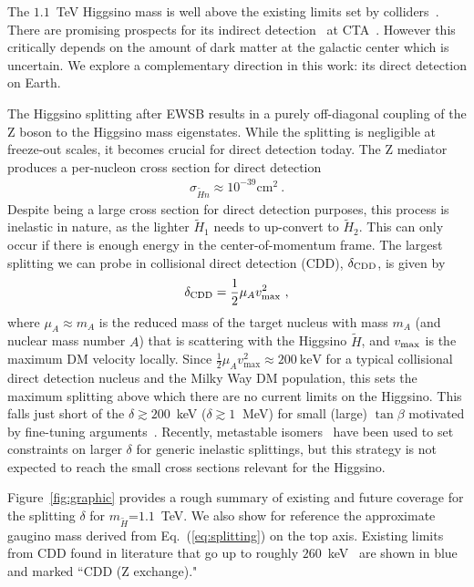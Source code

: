 \documentclass[aps,prd,amsmath,amssymb,10pt,letterpaper,balancelastpage,showpacs,superscriptaddress,nofootinbib,floatfix,notitlepage,longbibliography,twocolumn
]{revtex4-2}
\newcommand{\Eq}[1]{Eq.~(#1)}
\newcommand{\mx}{m_{\Ht}}
\newcommand{\vmax}{v_{\text{max}}}
\newcommand{\muA}{\mu_A}
\newcommand{\Ht}{\tilde{H}}
\begin{document}
The $1.1$~TeV Higgsino mass is well above the existing limits set by colliders~\cite{aaboud2018search}. There are promising prospects for its indirect detection~\cite{Rinchiuso:2020skh,Rodd:2024qsi} at CTA~\cite{CTAConsortium:2010umy}. However this critically depends on the amount of dark matter at the galactic center which is uncertain. We explore a complementary direction in this work: its direct detection on Earth. 

 The Higgsino splitting after EWSB results in a purely off-diagonal coupling of the Z boson to the Higgsino mass eigenstates. 
 While the splitting is negligible at freeze-out scales, it becomes crucial for direct detection today.  The Z mediator produces a per-nucleon cross section for direct detection
\begin{align} \label{eq:Higgsino cross section}
    \sigma_{\Ht n} \approx 10^{-39} \textrm{cm}^2 ~.
\end{align}
Despite being a large cross section for direct detection purposes, this process is inelastic in nature, as the lighter $\tilde{H}_1$ needs to up-convert to $\tilde{H}_2$.  This can only occur if there is enough energy in the center-of-momentum frame.  The largest splitting we can probe in collisional direct detection (CDD), $\delta_{\rm CDD}$, is given by  
\begin{align}
    \delta_{\rm CDD} =\frac{1}{2}\muA v_{\rm max}^2~,
    \label{eq:maxsplit}
\end{align} 
where $\muA \approx m_A$ is the reduced mass of the target nucleus with mass $m_A$ (and nuclear mass number $A$) that is scattering with the Higgsino $\tilde{H}$, and $v_{\rm max}$ is the maximum DM velocity locally.  Since $\frac{1}{2}\muA \vmax^2\approx 200~\textrm{keV}$ for a typical collisional direct detection nucleus and the Milky Way DM population, this sets the maximum splitting above which there are no current limits on the Higgsino.  This falls just short of the $\delta \gtrsim 200$~keV ($\delta \gtrsim 1~$ MeV) for small (large) $\tan \beta$ motivated by fine-tuning arguments~\cite{LastWIMP}. Recently, metastable isomers~\cite{isomer1,isomer2,isomer3,isomer4} have been used to set constraints on larger $\delta$ for generic inelastic splittings, but this strategy is not expected to reach the small cross sections relevant for the Higgsino.


Figure~\ref{fig:graphic} provides a rough summary of existing and future coverage for the splitting $\delta$ for $\mx$=$1.1$~TeV. We also show for reference the approximate gaugino mass derived from \Eq{\ref{eq:splitting}} on the top axis. Existing limits from CDD found in literature that go up to roughly $260$~keV~\cite{PandaX4T2021,PICO2023} are shown in blue and marked ``CDD (Z exchange)." 
\end{document}
